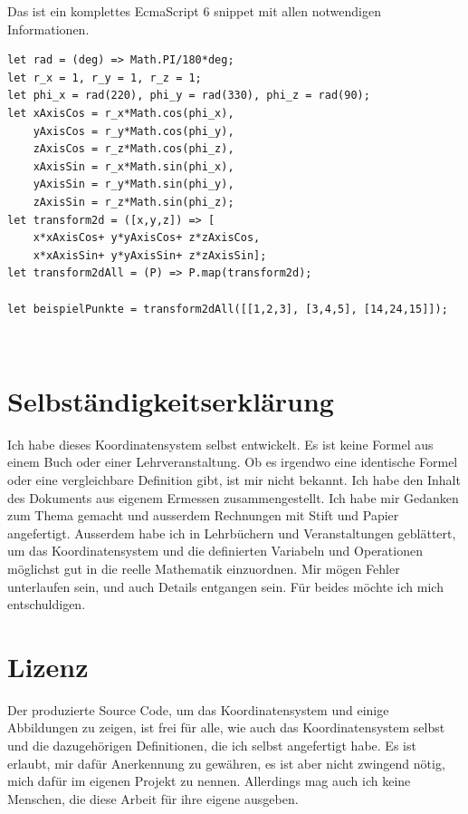 \documentclass[a4paper]{article}
\begin{document}
\begin{example}
Das ist ein komplettes EcmaScript 6 snippet mit allen notwendigen Informationen.\\
\begin{lstlisting}
let rad = (deg) => Math.PI/180*deg;
let r_x = 1, r_y = 1, r_z = 1; 
let phi_x = rad(220), phi_y = rad(330), phi_z = rad(90); 
let xAxisCos = r_x*Math.cos(phi_x), 
    yAxisCos = r_y*Math.cos(phi_y),
    zAxisCos = r_z*Math.cos(phi_z),
    xAxisSin = r_x*Math.sin(phi_x), 
    yAxisSin = r_y*Math.sin(phi_y),
    zAxisSin = r_z*Math.sin(phi_z);
let transform2d = ([x,y,z]) => [
    x*xAxisCos+ y*yAxisCos+ z*zAxisCos,
    x*xAxisSin+ y*yAxisSin+ z*zAxisSin];
let transform2dAll = (P) => P.map(transform2d);

let beispielPunkte = transform2dAll([[1,2,3], [3,4,5], [14,24,15]]);
\end{lstlisting}
\end{example}\\


\section{Selbst\"andigkeitserkl\"arung}

Ich habe dieses Koordinatensystem selbst entwickelt. Es ist keine Formel aus einem Buch oder einer Lehrveranstaltung.
Ob es irgendwo eine identische Formel oder eine vergleichbare Definition gibt, ist mir nicht bekannt.
Ich habe den Inhalt des Dokuments aus eigenem Ermessen zusammengestellt. Ich habe mir Gedanken zum Thema gemacht und
ausserdem Rechnungen mit Stift und Papier angefertigt. Ausserdem habe ich in Lehrb\"uchern und Veranstaltungen gebl\"attert,
um das Koordinatensystem und die definierten Variabeln und Operationen m\"oglichst gut in die reelle Mathematik einzuordnen.
Mir m\"ogen Fehler unterlaufen sein, und auch Details entgangen sein. F\"ur beides m\"ochte ich mich entschuldigen.\\


\section{Lizenz}

Der produzierte Source Code, um das Koordinatensystem und einige Abbildungen zu zeigen, ist frei f\"ur alle,
wie auch das Koordinatensystem selbst und die dazugeh\"origen Definitionen, die ich selbst angefertigt habe.
Es ist erlaubt, mir daf\"ur Anerkennung zu gew\"ahren, es ist aber nicht zwingend n\"otig, mich daf\"ur im
eigenen Projekt zu nennen. Allerdings mag auch ich keine Menschen, die diese Arbeit f\"ur ihre eigene ausgeben.\\
\end{document}
